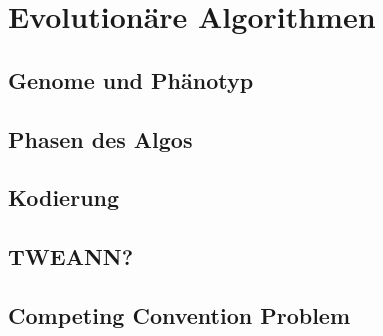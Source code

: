 \section{Evolutionäre Algorithmen}

\subsection{Genome und Phänotyp}
\subsection{Phasen des Algos}
\subsection{Kodierung}
\subsection{TWEANN?}
\label{subsec:tweann}
\subsection{Competing Convention Problem}
\label{subsec:competing_convention_problem}